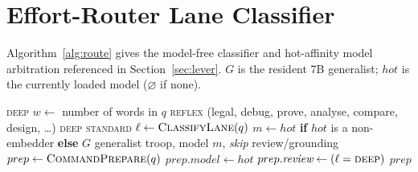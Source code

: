 \documentclass[10pt,twocolumn]{article}
\begin{document}
\appendix
\section{Effort-Router Lane Classifier}
\label{sec:appendix-router}
Algorithm~\ref{alg:route} gives the model-free classifier and hot-affinity
model arbitration referenced in Section~\ref{sec:lever}. $G$ is the resident
7B generalist; $hot$ is the currently loaded model ($\varnothing$ if none).

\begin{algorithm}[h]
\caption{Effort routing: lane classification (\textsc{ClassifyLane}) and
hot-affinity model arbitration (\textsc{RouteEffort}).}
\label{alg:route}
\small
\begin{algorithmic}[1]
     \State \Return \textsc{deep}
  \EndIf
  \State $w \gets$ number of words in $q$
     \State \Return \textsc{reflex}
  \EndIf
     \Statex \hfill{\footnotesize(legal, debug, prove, analyse, compare, design, \dots)}
     \State \Return \textsc{deep}
  \EndIf
  \State \Return \textsc{standard}
\EndProcedure
\Statex
{}
  \State $\ell \gets \Call{ClassifyLane}{q}$
     \State $m \gets hot$ \textbf{if} $hot$ is a non-embedder \textbf{else} $G$
     \State \Return generalist troop, model $m$, \emph{skip} review/grounding
  \EndIf
  \State $prep \gets \Call{CommandPrepare}{q}$
     \State $prep.\textit{model} \gets hot$
  \EndIf
  \State $prep.\textit{review} \gets (\ell = \textsc{deep})$
  \State \Return $prep$
\EndProcedure
\end{algorithmic}
\end{algorithm}



\end{document}
